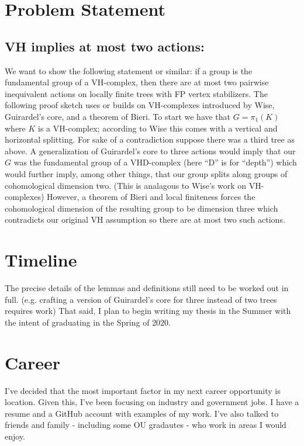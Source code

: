 \documentclass{article}
\theoremstyle{mystyle}
\theoremstyle{remark}
\begin{document}
\section{Problem Statement}

\subsection{VH implies at most two actions:}

We want to show the following statement or similar: if a group is the fundamental group of a VH-complex, then there are at most two pairwise inequivalent actions on locally finite trees with FP vertex stabilizers. The following proof sketch uses or builds on VH-complexes introduced by Wise, Guirardel's core, and a theorem of Bieri. To start we have that \(G = \pi_1(K)\) where \(K\) is a VH-complex; according to Wise this comes with a vertical and horizontal splitting. For sake of a contradiction suppose there was a third tree as above. A generalization of Guirardel's core to three actions would imply that our \(G\) was the fundamental group of a VHD-complex (here ``D'' is for ``depth'') which would further imply, among other things, that our group splits along groups of cohomological dimension two. (This is analagous to Wise's work on VH-complexes) However, a theorem of Bieri and local finiteness forces the cohomological dimension of the resulting group to be dimension three which contradicts our original VH assumption so there are at most two such actions.


\section{Timeline}

The precise details of the lemmas and definitions still need to be worked out in full. (e.g. crafting a version of Guirardel's core for three instead of two trees requires work) That said, I plan to begin writing my thesis in the Summer with the intent of graduating in the Spring of 2020.

\section{Career}
I've decided that the most important factor in my next career opportunity is location. Given this, I've been focusing on industry and government jobs. I have a resume and a GitHub account with examples of my work. I've also talked to  friends and family - including some OU gradautes - who work in areas I would enjoy.
\end{document}
